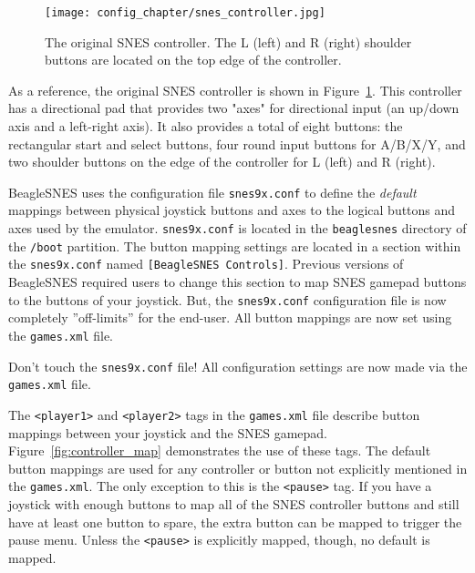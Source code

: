 \begin{figure}[h]
\centering\texttt{[image: config\_chapter/snes\_controller.jpg]}
\caption{The original SNES controller. The L (left) and R (right) shoulder buttons are located on the top edge of the controller.}\label{fig:snes_controller}
\end{figure}

As a reference, the original SNES controller is shown in Figure~\ref{fig:snes_controller}.  This controller has a directional pad that provides two "axes" for directional input (an up/down axis and a left-right axis).  It also provides a total of eight buttons: the rectangular start and select buttons, four round input buttons for A/B/X/Y, and two shoulder buttons on the edge of the controller for L (left) and R (right).

BeagleSNES uses the configuration file \texttt{snes9x.conf} to define the \emph{default} mappings between physical joystick buttons and axes to the logical buttons and axes used by the emulator.  \texttt{snes9x.conf} is located in the \texttt{beaglesnes} directory of the \texttt{/boot} partition.  The button mapping settings are located in a section within the \texttt{snes9x.conf} named \texttt{[BeagleSNES Controls]}.  Previous versions of BeagleSNES required users to change this section to map SNES gamepad buttons to the buttons of your joystick.  But, the \texttt{snes9x.conf} configuration file is now completely ''off-limits'' for the end-user.  All button mappings are now set using the \texttt{games.xml} file.

\begin{updateWarn}
Don't touch the \texttt{snes9x.conf} file!  All configuration settings are now made via the \texttt{games.xml} file.
\end{updateWarn}    

The \texttt{<player1>} and \texttt{<player2>} tags in the \texttt{games.xml} file describe button mappings between your joystick and the SNES gamepad. Figure~\ref{fig:controller_map} demonstrates the use of these tags.  The default button mappings are used for any controller or button not explicitly mentioned in the \texttt{games.xml}.  The only exception to this is the \texttt{<pause>} tag.  If you have a joystick with enough buttons to map all of the SNES controller buttons and still have at least one button to spare, the extra button can be mapped to trigger the pause menu.  Unless the \texttt{<pause>} is explicitly mapped, though, no default is mapped.  


